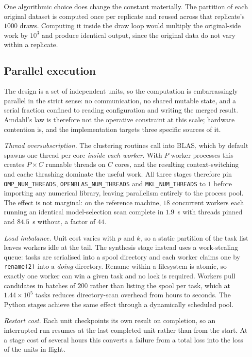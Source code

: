 \documentclass[pdflatex,sn-basic]{sn-jnl}
\begin{document}
\begin{appendices}
One algorithmic choice does change the constant materially. The partition of
each original dataset is computed once per replicate and reused across that
replicate's $1000$ draws. Computing it inside the draw loop would multiply the
original-side work by $10^{3}$ and produce identical output, since the original
data do not vary within a replicate.

\subsection{Parallel execution}

The design is a set of independent units, so the computation is
embarrassingly parallel in the strict sense: no communication, no shared mutable
state, and a serial fraction confined to reading configuration and writing the
merged result. Amdahl's law is therefore not the operative constraint at this
scale; hardware contention is, and the implementation targets three specific
sources of it.

\emph{Thread oversubscription.} The clustering routines call into BLAS, which by
default spawns one thread per core \emph{inside each worker}. With $P$ worker
processes this creates $P \times C$ runnable threads on $C$ cores, and the
resulting context-switching and cache thrashing dominate the useful work. All
three stages therefore pin \texttt{OMP\_NUM\_THREADS},
\texttt{OPENBLAS\_NUM\_THREADS} and \texttt{MKL\_NUM\_THREADS} to $1$ before
importing any numerical library, leaving parallelism entirely to the process
pool. The effect is not marginal: on the reference machine, $18$ concurrent
workers each running an identical model-selection scan complete in $1.9$~s with
threads pinned and $84.5$~s without, a factor of $44$.

\emph{Load imbalance.} Unit cost varies with $p$ and $k$, so a static partition
of the task list leaves workers idle at the tail. The synthesis stage instead
uses a work-stealing queue: tasks are serialised into a spool directory and each
worker claims one by \texttt{rename(2)} into a \emph{doing} directory. Rename
within a filesystem is atomic, so exactly one worker can win a given task and no
lock is required. Workers pull candidates in batches of $200$ rather than
listing the spool per task, which at $1.44 \times 10^{5}$ tasks reduces
directory-scan overhead from hours to seconds. The Python stages achieve the
same effect through a dynamically scheduled pool.

\emph{Restart cost.} Each unit checkpoints its own result on completion, so an
interrupted run resumes at the last completed unit rather than from the start.
At a stage cost of several hours this converts a failure from a total loss into
the loss of the units in flight.


\end{appendices}
\end{document}
